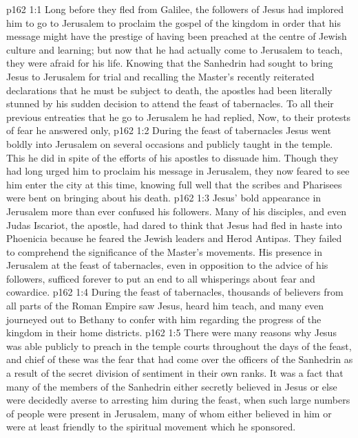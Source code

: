 \vs p162 1:1 Long before they fled from Galilee, the followers of Jesus had implored him to go to Jerusalem to proclaim the gospel of the kingdom in order that his message might have the prestige of having been preached at the centre of Jewish culture and learning; but now that he had actually come to Jerusalem to teach, they were afraid for his life. Knowing that the Sanhedrin had sought to bring Jesus to Jerusalem for trial and recalling the Master’s recently reiterated declarations that he must be subject to death, the apostles had been literally stunned by his sudden decision to attend the feast of tabernacles. To all their previous entreaties that he go to Jerusalem he had replied,  Now, to their protests of fear he answered only, 
\vs p162 1:2 During the feast of tabernacles Jesus went boldly into Jerusalem on several occasions and publicly taught in the temple. This he did in spite of the efforts of his apostles to dissuade him. Though they had long urged him to proclaim his message in Jerusalem, they now feared to see him enter the city at this time, knowing full well that the scribes and Pharisees were bent on bringing about his death.
\vs p162 1:3 Jesus’ bold appearance in Jerusalem more than ever confused his followers. Many of his disciples, and even Judas Iscariot, the apostle, had dared to think that Jesus had fled in haste into Phoenicia because he feared the Jewish leaders and Herod Antipas. They failed to comprehend the significance of the Master’s movements. His presence in Jerusalem at the feast of tabernacles, even in opposition to the advice of his followers, sufficed forever to put an end to all whisperings about fear and cowardice.
\vs p162 1:4 During the feast of tabernacles, thousands of believers from all parts of the Roman Empire saw Jesus, heard him teach, and many even journeyed out to Bethany to confer with him regarding the progress of the kingdom in their home districts.
\vs p162 1:5 There were many reasons why Jesus was able publicly to preach in the temple courts throughout the days of the feast, and chief of these was the fear that had come over the officers of the Sanhedrin as a result of the secret division of sentiment in their own ranks. It was a fact that many of the members of the Sanhedrin either secretly believed in Jesus or else were decidedly averse to arresting him during the feast, when such large numbers of people were present in Jerusalem, many of whom either believed in him or were at least friendly to the spiritual movement which he sponsored.
